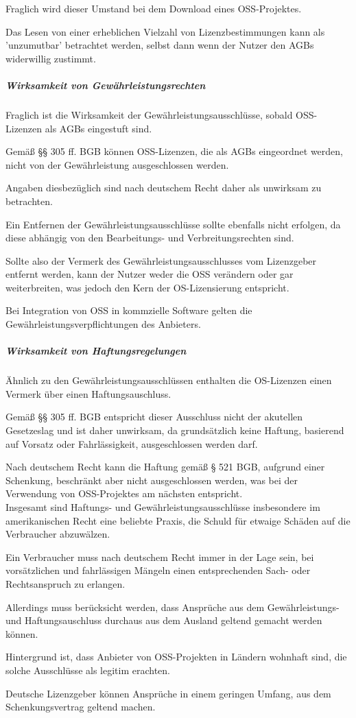 Fraglich wird dieser Umstand bei dem Download eines OSS-Projektes. 

Das Lesen von einer erheblichen Vielzahl von Lizenzbestimmungen kann als 'unzumutbar' betrachtet werden, selbst dann wenn der Nutzer den AGBs widerwillig zustimmt. 

\subparagraph{Wirksamkeit von Gewährleistungsrechten}
Fraglich ist die Wirksamkeit der Gewährleistungsausschlüsse, sobald OSS-Lizenzen als AGBs eingestuft sind. 

Gemäß §§ 305 ff. BGB können OSS-Lizenzen, die als AGBs eingeordnet werden, nicht von der Gewährleistung ausgeschlossen werden. 

Angaben diesbezüglich sind nach deutschem Recht daher als unwirksam zu betrachten. 

Ein Entfernen der Gewährleistungsausschlüsse sollte ebenfalls nicht erfolgen, da diese abhängig von den Bearbeitungs- und Verbreitungsrechten sind. 

Sollte also der Vermerk des Gewährleistungsausschlusses vom Lizenzgeber entfernt werden, kann der Nutzer weder die OSS verändern oder gar weiterbreiten, was jedoch den Kern der OS-Lizensierung entspricht. 

Bei Integration von OSS in kommzielle Software gelten die Gewährleistungsverpflichtungen des Anbieters. 

\subparagraph{Wirksamkeit von Haftungsregelungen}
Ähnlich zu den Gewährleistungsausschlüssen enthalten die OS-Lizenzen einen Vermerk über einen Haftungsauschluss. 

Gemäß §§ 305 ff. BGB entspricht dieser Ausschluss nicht der akutellen Gesetzeslag und ist daher unwirksam, da grundsätzlich keine Haftung, basierend auf Vorsatz oder Fahrlässigkeit, ausgeschlossen werden darf.

Nach deutschem Recht kann die Haftung gemäß § 521 BGB, aufgrund einer Schenkung, beschränkt aber nicht ausgeschlossen werden, was bei der Verwendung von OSS-Projektes am nächsten entspricht. \\

Insgesamt sind Haftungs- und Gewährleistungsausschlüsse insbesondere im amerikanischen Recht eine beliebte Praxis, die Schuld für etwaige Schäden auf die Verbraucher abzuwälzen. 

Ein Verbraucher muss nach deutschem Recht immer in der Lage sein, bei vorsätzlichen und fahrlässigen Mängeln einen entsprechenden Sach- oder Rechtsanspruch zu erlangen.

Allerdings muss berücksicht werden, dass Ansprüche aus dem Gewährleistungs- und Haftungsauschluss durchaus aus dem Ausland geltend gemacht werden können. 

Hintergrund ist, dass Anbieter von OSS-Projekten in Ländern wohnhaft sind, die solche Ausschlüsse als legitim erachten. 

Deutsche Lizenzgeber können Ansprüche in einem geringen Umfang, aus dem Schenkungsvertrag geltend machen. 

